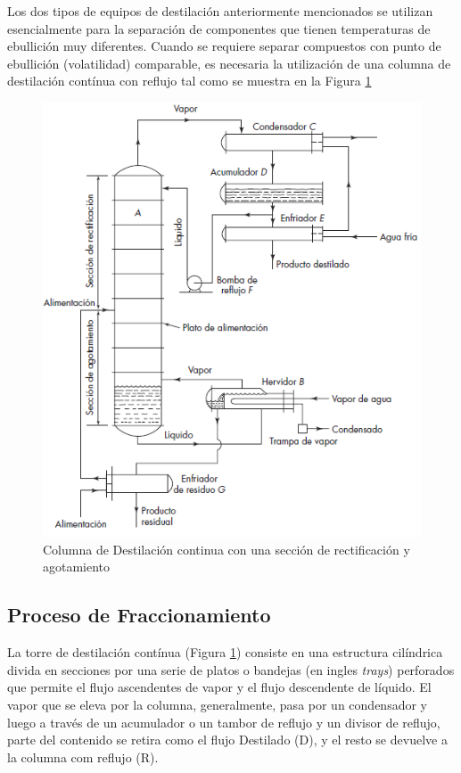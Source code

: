 \documentclass[11pt]{book}
\begin{document}
Los dos tipos de equipos de destilación anteriormente mencionados se utilizan esencialmente para la separación de componentes que tienen temperaturas de ebullición muy diferentes. Cuando se requiere separar compuestos con punto de ebullición (volatilidad) comparable, es necesaria la utilización de una columna de destilación contínua con reflujo tal como se muestra en la Figura \ref{fig:ColumnaDestilacion_1}

\begin{figure}[H]
    \centering
    \includegraphics{img/destilacion/ColumnaDestilacion.PNG}
    \caption{Columna de Destilación continua con una sección de rectificación y agotamiento}
    \label{fig:ColumnaDestilacion_1}
\end{figure}

\subsection{Proceso de Fraccionamiento}

La torre de destilación contínua (Figura \ref{fig:ColumnaDestilacion_1}) consiste en una estructura cilíndrica divida en secciones por una serie de platos o bandejas (en ingles \textit{trays}) perforados que permite el flujo ascendentes de vapor y el flujo descendente de líquido. El vapor que se eleva por la columna, generalmente, pasa por un condensador y luego a través de un acumulador o un tambor de reflujo y un divisor de reflujo, parte del contenido se retira como el flujo Destilado (D), y el resto se devuelve a la columna com reflujo (R).
\end{document}
